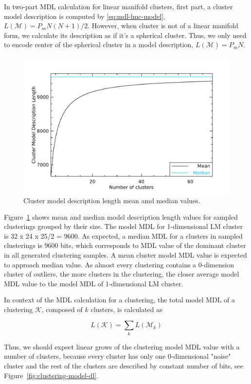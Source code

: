 In two-part MDL calculation for linear manifold clusters, first part, a cluster
model description is computed by \eqref{eq:mdl-lmc-model},
$L(\mathcal{M}) = P_m N (N+1)/2$.
However, when cluster is not of a linear manifold form, we calculate its
description as if it's a spherical cluster. Thus, we only need to encode center
of the spherical cluster in a model description, $L(\mathcal{M}) = P_m N$.

\begin{figure}[H]
\center
\includegraphics[width=5.0in]{img/mdl-clust_model-dl-stats_1.pdf}
\caption{Cluster model description length mean amd median values.}
\label{fig:model-dl-stats}
\end{figure}



Figure~\ref{fig:model-dl-stats} shows mean and median model description length
values for sampled clusterings grouped by their size. The model MDL for
1-dimensional LM cluster is 32 x 24 x 25/2 = 9600. As expected, a median MDL for
a clusters in sampled clusterings is 9600 bits, which corresponds to MDL value
of the dominant cluster in all generated clustering samples. A mean cluster
model MDL value is expected to approach median value. As almost every clustering
contains a 0-dimension cluster of outliers, the more clusters in the clustering,
the closer average model MDL value to the model MDL of 1-dimensional LM cluster.

In context of the MDL calculation for a clustering, the total model MDL of
a clustering $\mathcal{K}$, composed of $k$ clusters, is calculated as

$$L(\mathcal{K}) = \sum_k L(\mathcal{M}_k)$$

Thus, we should expect linear grows of the clustering model MDL value with
a number of clusters, because every cluster has only one 0-dimensional "noise"
cluster and the rest of the clusters are described by constant number of bits,
see Figure~\ref{fig:clustering-model-dl}.

